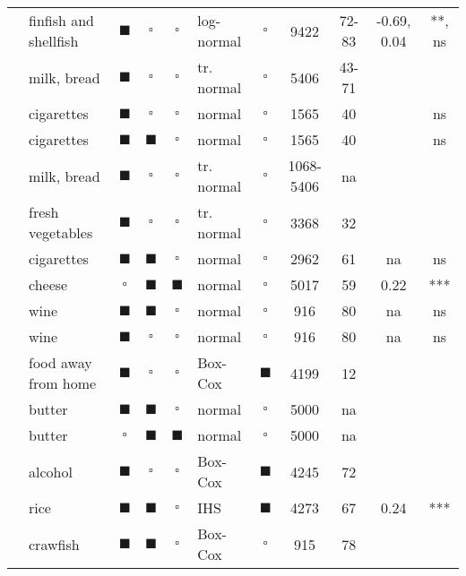 \begin{landscape}
\begin{center}
\begin{footnotesize}
\begin{longtable}{llccclccccc}
\endlastfoot 
\cite{CHEN:CAPP:88} & finfish and shellfish & $\blacksquare$ & $\square$ & $\square$ & log-normal & $\square$ & 9422 & 72-83 & -0.69, 0.04 & **, ns \\ 
  \cite{HAIN:GUIL:POPK:88} & milk, bread & $\blacksquare$ & $\square$ & $\square$ & tr. normal & $\square$ & 5406 & 43-71 &  &  \\ 
  \cite{JONE:89} & cigarettes & $\blacksquare$ & $\square$ & $\square$ & normal & $\square$ & 1565 & 40 &  & ns \\ 
  \cite{JONE:89} & cigarettes & $\blacksquare$ & $\blacksquare$ & $\square$ & normal & $\square$ & 1565 & 40 &  & ns \\ 
  \cite{POPK:GUIL:HAIN:89} & milk, bread & $\blacksquare$ & $\square$ & $\square$ & tr. normal & $\square$ & 1068-5406 & na &  &  \\ 
  \cite{REYN:90} & fresh vegetables & $\blacksquare$ & $\square$ & $\square$ & tr. normal & $\square$ & 3368 & 32 &  &  \\ 
  \cite{BLAY:BLIS:92b} & cigarettes & $\blacksquare$ & $\blacksquare$ & $\square$ & normal & $\square$ & 2962 & 61 & na & ns \\ 
  \cite{GOUL:92} & cheese & $\square$ & $\blacksquare$ & $\blacksquare$ & normal & $\square$ & 5017 & 59 & 0.22 & *** \\ 
  \cite{BLAY:BLIS:93} & wine & $\blacksquare$ & $\blacksquare$ & $\square$ & normal & $\square$ & 916 & 80 & na & ns \\ 
  \cite{BLAY:BLIS:93} & wine & $\blacksquare$ & $\square$ & $\square$ & normal & $\square$ & 916 & 80 & na & ns \\ 
  \cite{YEN:93} & food away from home & $\blacksquare$ & $\square$ & $\square$ & Box-Cox & $\blacksquare$ & 4199 & 12 &  &  \\ 
  \cite{BLIS:BLAY:93} & butter & $\blacksquare$ & $\blacksquare$ & $\square$ & normal & $\square$ & 5000 & na &  &  \\ 
  \cite{BLIS:BLAY:93} & butter & $\square$ & $\blacksquare$ & $\blacksquare$ & normal & $\square$ & 5000 & na &  &  \\ 
  \cite{YEN:94} & alcohol & $\blacksquare$ & $\square$ & $\square$ & Box-Cox & $\blacksquare$ & 4245 & 72 &  &  \\ 
  \cite{GAO:WAIL:CRAM:95} & rice & $\blacksquare$ & $\blacksquare$ & $\square$ & IHS & $\blacksquare$ & 4273 & 67 & 0.24 & *** \\ 
  \cite{YEN:DELL:SCHUP:95} & crawfish & $\blacksquare$ & $\blacksquare$ & $\square$ & Box-Cox & $\square$ & 915 & 78 &  &  \\ 

\end{longtable}
\end{footnotesize}
\end{center}
\end{landscape}
